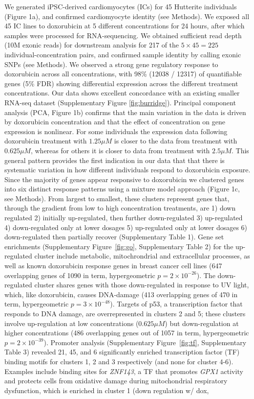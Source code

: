 \documentclass{article}
\begin{document}
We generated iPSC-derived cardiomyocytes (ICs) for 45 Hutterite individuals (Figure 1a), and confirmed cardiomyocyte identity (see Methods). We exposed all 45 IC lines to doxorubicin at 5 different concentrations for 24 hours, after which samples were processed for RNA-sequencing. We obtained sufficient read depth (10M exonic reads) for downstream analysis for 217 of the $5 \times 45 = 225$ individual-concentration pairs, and confirmed sample identity by calling exonic SNPs (see Methods). We observed a strong gene regulatory response to doxorubicin across all concentrations, with 98\% (12038 / 12317) of quantifiable genes (5\% FDR) showing differential expression across the different treatment concentrations. Our data shows excellent concordance with an existing smaller RNA-seq dataset\cite{Burridge2016} (Supplementary Figure \ref{fig:burridge}). Principal component analysis (PCA, Figure 1b) confirms that the main variation in the data is driven by doxorubicin concentration and that the effect of concentration on gene expression is nonlinear. For some individuals the expression data following doxorubicin treatment with $1.25\mu M$ is closer to the data from treatment with $0.625 \mu M$, whereas for others it is closer to data from treatment with $2.5\mu M$. This general pattern provides the first indication in our data that that there is systematic variation in how different individuals respond to doxorubicin exposure. Since the majority of genes appear responsive to doxorubicin we clustered genes into six distinct response patterns using a mixture model approach (Figure 1c, see Methods). From largest to smallest, these clusters represent genes that, through the gradient from low to high concentration treatments, are  1) down regulated 2) initially up-regulated, then further down-regulated 3) up-regulated 4) down-regulated only at lower dosages 5) up-regulated only at lower dosages 6) down-regulated then partially recover (Supplementary Table 1). Gene set enrichments (Supplementary Figure~\ref{fig:go}, Supplementary Table 2) for the up-regulated cluster include metabolic, mitochrondrial and extracellular processes, as well as known doxorubicin response genes in breast cancer cell lines \cite{graessmann2007chemotherapy} (647 overlapping genes of 1090 in term, hypergeometric $p=2 \times 10^{-26}$). The down-regulated cluster shares genes with those down-regulated in response to UV light, which, like doxorubicin, causes DNA-damage (413 overlapping genes of 470 in term, hypergeometric $p=3 \times 10^{-48}$). Targets of p53, a transcription factor that responds to DNA damage, are overrepresented in clusters 2 and 5; these clusters involve up-regulation at low concentrations ($0.625\mu M$) but down-regulation at higher concentrations (486 overlapping genes out of 1057 in term, hypergeometric $p=2 \times 10^{-39}$). Promoter analysis (Supplementary Figure~\ref{fig:tf}, Supplementary Table 3) revealed 21, 45, and 6 significantly enriched transcription factor (TF) binding motifs for clusters 1, 2 and 3 respectively (and none for cluster 4-6). Examples include binding sites for \emph{ZNF143}, a TF that promotes \emph{GPX1} activity and protects cells from oxidative damage during mitochondrial respiratory dysfunction\cite{Lu2012}, which is enriched in cluster 1 (down regulation w/ dox, 
\end{document}
